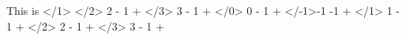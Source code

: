 \par\noindent This is \CurrentFile
\mySection</1>{         \myRLTVLevelBaseExpected}
\mySection</2>{ 2 - 1 + \myRLTVLevelBaseExpected}
\mySection</3>{ 3 - 1 + \myRLTVLevelBaseExpected}
\mySection</0>{ 0 - 1 + \myRLTVLevelBaseExpected}
\mySection</-1>{-1 -1 + \myRLTVLevelBaseExpected}
\mySection</1>{ 1 - 1 + \RLTVLevelBase}
\mySection</2>{ 2 - 1 + \RLTVLevelBase}
\mySection</3>{ 3 - 1 + \RLTVLevelBase}
